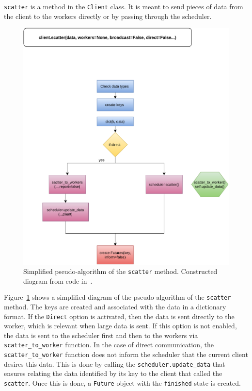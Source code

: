 \texttt{scatter} is a method in the \dask \texttt{Client} class. It is meant to send pieces of data from the client to the workers directly or by passing through the scheduler.

\begin{figure}\centering
\includegraphics[scale=0.5]{figures/scatter.pdf}
\caption{Simplified pseudo-algorithm of the \dask \texttt{scatter} method. Constructed diagram from code in~\cite{amal_distributed_2022}.}
\label{figoldscatter}
\end{figure}

Figure~\ref{figoldscatter} shows a simplified diagram of the pseudo-algorithm of the \texttt{scatter} method. The keys are created and associated with the data in a dictionary format. If the \texttt{Direct} option is activated, then the data is sent directly to the worker, which is relevant when large data is sent. If this option is not enabled, the data is sent to the scheduler first and then to the workers via \texttt{scatter\_to\_worker} function. In the case of direct communication, the \texttt{scatter\_to\_worker} function does not inform the scheduler that the current client desires this data. This is done by calling the \texttt{scheduler.update\_data} that ensures relating the data identified by its key to the client that called the \texttt{scatter}. Once this is done, a \texttt{Future} object with the \texttt{finished} state is created. 

